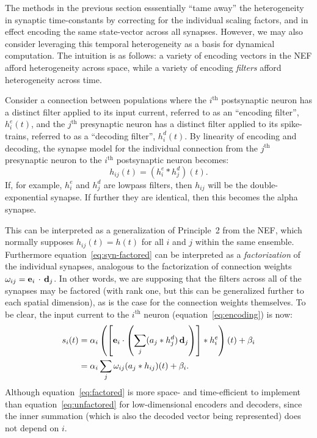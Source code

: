 The methods in the previous section esssentially ``tame away'' the heterogeneity in synaptic time-constants by correcting for the individual scaling factors, and in effect encoding the same state-vector across all synapses.
However, we may also consider leveraging this temporal heterogeneity as a basis for dynamical computation.
The intuition is as follows: a variety of encoding vectors in the NEF afford heterogeneity across space, while a variety of encoding \emph{filters} afford heterogeneity across time.

Consider a connection between populations where the $i^\text{th}$ postsynaptic neuron has a distinct filter applied to its input current, referred to as an ``encoding filter'', $h^e_i(t)$, and the $j^\text{th}$ presynaptic neuron has a distinct filter applied to its spike-trains, referred to as a ``decoding filter'', $h^d_i(t)$. 
By linearity of encoding and decoding, the synapse model for the individual connection from the $j^\text{th}$ presynaptic neuron to the $i^\text{th}$ postsynaptic neuron becomes:
\begin{equation} \label{eq:syn-factored}
h_{ij}(t) = (h^e_i \ast h^d_j)(t) \text{.}
\end{equation}
If, for example, $h^e_i$ and $h^d_j$ are lowpass filters, then $h_{ij}$ will be the double-exponential synapse. If further  they are identical, then this becomes the alpha synapse.

This can be interpreted as a generalization of Principle~2 from the NEF, which normally supposes $h_{ij}(t) = h(t)$ for all $i$ and $j$ within the same ensemble.
Furthermore equation~\ref{eq:syn-factored} can be interpreted as a \emph{factorization} of the individual synapses, analogous to the factorization of connection weights \mbox{$\omega_{ij} = \mathbf{e}_i \, \cdot \, \mathbf{d}_j$}.
In other words, we are supposing that the filters across all of the synapses may be factored (with rank one, but this can be generalized further to each spatial dimension), as is the case for the connection weights themselves.
To be clear, the input current to the $i^\text{th}$ neuron (equation~\ref{eq:encoding}) is now:
\begin{align}
s_i(t) &= \alpha_i \left( \left[ \mathbf{e}_i \cdot \left( \sum_j ( a_j \ast h^d_j) \, \mathbf{d}_j \right) \right] \ast h^e_i \right)(t) + \beta_i \label{eq:factored} \\
       &= \alpha_i \sum_j \omega_{ij} (a_j \ast h_{ij})(t) + \beta_i . \label{eq:unfactored}
\end{align}
Although equation~\ref{eq:factored} is more space- and time-efficient to implement than equation~\ref{eq:unfactored} for low-dimensional encoders and decoders, since the inner summation (which is also the decoded vector being represented) does not depend on $i$.

